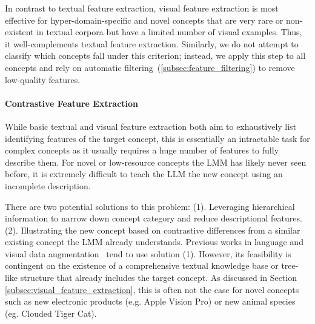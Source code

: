 In contrast to textual feature extraction, visual feature extraction is most effective for hyper-domain-specific and novel concepts that are very rare or non-existent in textual corpora but have a limited number of visual examples. Thus, it well-complements textual feature extraction. Similarly, we do not attempt to classify which concepts fall under this criterion; instead, we apply this step to all concepts and rely on automatic filtering~(\ref{subsec:feature_filtering}) to remove low-quality features.














\vspace{-1em}
\paragraph*{Contrastive Feature Extraction} 
\label{subsec:contrastive_feature_extraction}

While basic textual and visual feature extraction both aim to exhaustively list identifying features of the target concept, this is essentially an intractable task for complex concepts as it usually requires a huge number of features to fully describe them. For novel or low-resource concepts the LMM has likely never seen before, it is extremely difficult to teach the LLM the new concept using an incomplete description. 

There are two potential solutions to this problem: (1). Leveraging hierarchical information to narrow down concept category and reduce descriptional features. (2). Illustrating the new concept based on contrastive differences from a similar existing concept the LMM already understands. Previous works in language and visual data augmentation~\cite{jin2024armada} tend to use solution (1). However, its feasibility is contingent on the existence of a comprehensive textual knowledge base or tree-like structure that already includes the target concept. As discussed in Section \ref{subsec:visual_feature_extraction}, this is often not the case for novel concepts such as new electronic products (e.g. Apple Vision Pro) or new animal species (eg. Clouded Tiger Cat).


